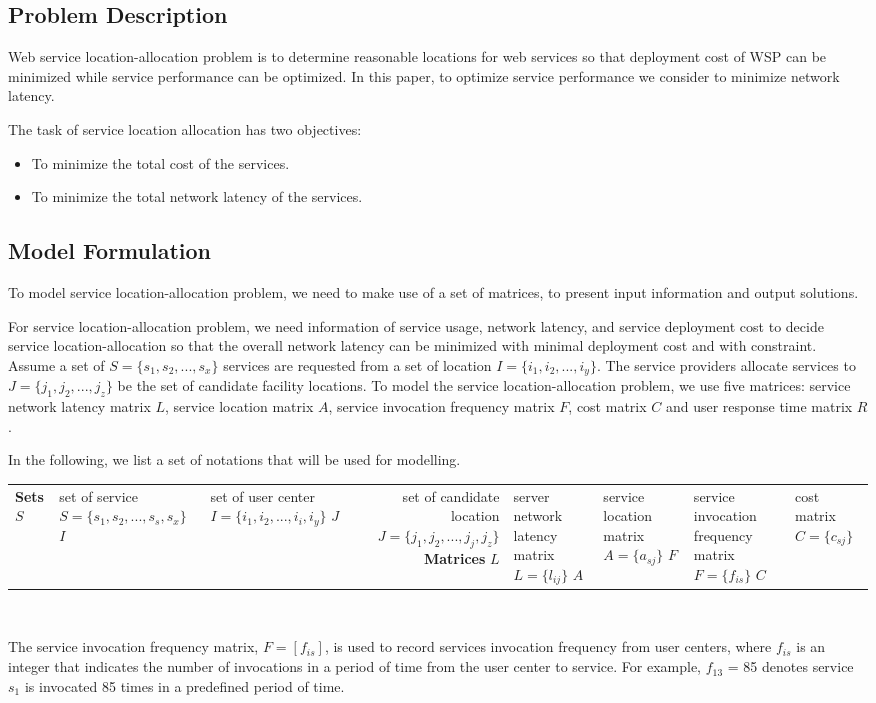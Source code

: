 \documentclass{llncs}
\begin{document}
\subsection{Problem Description}
Web service location-allocation problem is to determine reasonable locations for web services so that deployment cost of WSP can be minimized while service performance can be optimized.
In this paper, to optimize service performance we consider to minimize network latency.

The task of service location allocation has two objectives:
\begin{itemize}
	\item To minimize the total cost of the services.
	\item To minimize the total network latency of the services.
\end{itemize}


\subsection{Model Formulation}
To model service location-allocation problem, we need to make use of a set of matrices, to present input information and output solutions. 

For service location-allocation problem, we need information of service usage, network latency, and service deployment cost to decide service location-allocation so that the overall network latency can be minimized with minimal deployment cost and with constraint.
Assume a set of $S = \{ s_{1}, s_{2}, ..., s_{x}\}$ services are
requested from a set of location $I = \{ i_{1}, i_{2}, ..., i_{y} \}$. The service providers allocate services 
to $J = \{ j_{1}, j_{2}, ..., j_{z} \}$ be the set of candidate facility locations.
To model the service location-allocation problem, we use five matrices: 
service network latency matrix $L$, service location
matrix $A$, service invocation frequency matrix $F$, cost matrix $C$ and user response time matrix $R$.

In the following, we list a set of notations that will be used for modelling. 
{
\centering
	\begin{tabular}{l*{2}{l}r}
		\hline
		\textbf{Sets} \cr
		$S$	& set of service $S = \{s_{1}, s_{2}, ..., s_{s}, s_{x}\}$ \cr
		$I$	& set of user center $I = \{i_{1}, i_{2}, ..., i_{i}, i_{y}\}$ \cr
		$J$	& set of candidate location $J = \{j_{1}, j_{2}, ..., j_{j}, j_{z}\}$ \cr
		\textbf{Matrices} \cr
		$L$ & server network latency matrix $L = \{l_{ij}\}$ \cr
		$A$ & service location matrix $A = \{a_{sj}\}$ \cr
		$F$ & service invocation frequency matrix $F = \{f_{is}\}$ \cr
		$C$ & cost matrix $C = \{c_{sj}\}$ \cr
		\hline
	\end{tabular}
\\
}
The service invocation frequency matrix, $F= [f_{is}]$, is used to record services invocation frequency from user centers, 
where $f_{is}$ is an integer that indicates the number of invocations in a period of time from the user center to service. 
For example, $f_{13}$ = 85 denotes service $s_{1}$ is invocated 85 times in a predefined period of time.
\end{document}
